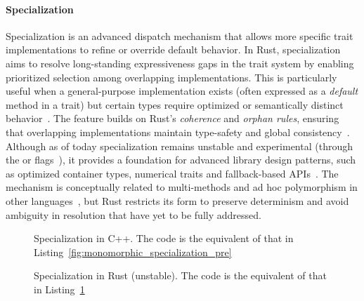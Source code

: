 \paragraph{Specialization}
Specialization is an advanced dispatch mechanism that allows more specific trait implementations to refine or override default behavior.
In Rust, specialization aims to resolve long-standing expressiveness gaps in the trait system by enabling prioritized selection among overlapping implementations.
This is particularly useful when a general-purpose implementation exists (often expressed as a \textit{default} method in a trait) but certain types require optimized or semantically distinct behavior~\cite{MatsakisRFC1210}.
The feature builds on Rust's \textit{coherence} and \textit{orphan rules}\cite{RustOrphanRules}, ensuring that overlapping implementations maintain type-safety and global consistency~\cite{Chlipala11}.
Although as of today specialization remains unstable and experimental (through the  or  flags~\cite{SpecializationRFC,MinSpecialization}), it provides a foundation for advanced library design patterns, such as optimized container types, numerical traits and fallback-based APIs~\cite{MatsakisRFC1210}.
The mechanism is conceptually related to multi-methods and ad hoc polymorphism in other languages~\cite{Chambers92,Castagna95}, but Rust restricts its form to preserve determinism and avoid ambiguity in resolution that have yet to be fully addressed.

\begin{figure}[htbp!]
	\centering
	\captionsetup{type=listing,skip=2pt}
	\caption{Specialization in C++. The code is the equivalent of that in Listing~\ref{fig:monomorphic_specialization_pre}}
	\label{fig:cpp-specialization}
\end{figure}

\begin{figure}[htbp!]
	\centering
	\captionsetup{type=listing,skip=2pt}
	\caption{Specialization in Rust (unstable). The code is the equivalent of that in Listing~\ref{fig:cpp-specialization}}
	\label{fig:rust-specialization}
\end{figure}


